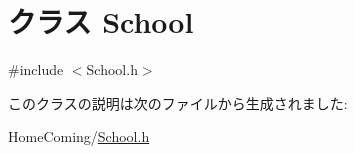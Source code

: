 \hypertarget{class_school}{\section{クラス School}
\label{class_school}
}


{\ttfamily \#include $<$School.\-h$>$}



このクラスの説明は次のファイルから生成されました\-:\begin{DoxyCompactItemize}
\item 
Home\-Coming/\hyperlink{_school_8h}{School.\-h}\end{DoxyCompactItemize}
